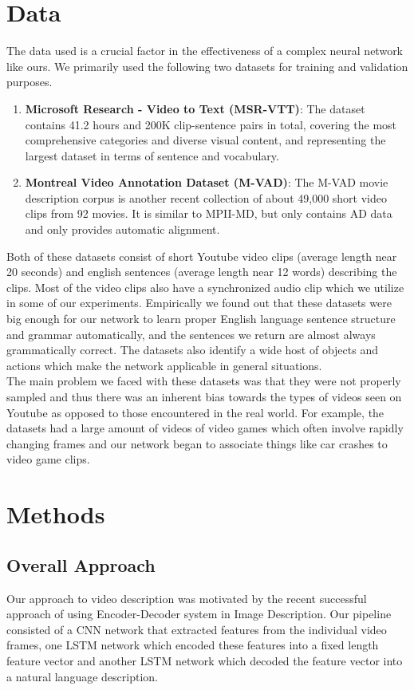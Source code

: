\documentclass[12pt]{article}
\begin{document}
	\section{Data}
The data used is a crucial factor in the effectiveness of a complex neural network like ours. We primarily used the following two datasets for training and validation purposes.
	\begin{enumerate}
		\item
			\textbf{Microsoft Research - Video to Text (MSR-VTT)}: The dataset contains 41.2 hours and 200K clip-sentence pairs in total, covering the most comprehensive categories and diverse visual content, and representing the largest dataset in terms of sentence and vocabulary.
		\item
			\textbf{Montreal Video Annotation Dataset (M-VAD)}: The M-VAD movie description corpus is another recent collection of about 49,000 short video clips from 92 movies. It is similar to MPII-MD, but only contains AD data and only provides automatic alignment.
		\end{enumerate}
		Both of these datasets consist of short Youtube video clips (average length near 20 seconds) and english sentences (average length near 12 words) describing the clips. Most of the video clips also have a synchronized audio clip which we utilize in some of our experiments. 
		Empirically we found out that these datasets were big enough for our network to learn proper English language sentence structure and grammar automatically, and the sentences we return are almost always grammatically correct. The datasets also identify a wide host of objects and actions which make the network applicable in general situations.\\
		The main problem we faced with these datasets was that they were not properly sampled and thus there was an inherent bias towards the types of videos seen on Youtube as opposed to those encountered in the real world. For example, the datasets had a large amount of videos of video games which often involve rapidly changing frames and our network began to associate things like car crashes to video game clips. 
\section{Methods}
\subsection{Overall Approach}
	Our approach to video description was motivated by the recent successful approach of using Encoder-Decoder system in Image Description.
	Our pipeline consisted of a CNN network that extracted features from the individual video frames, one LSTM network which encoded these features into a fixed length feature vector and another LSTM network which decoded the feature vector into a natural language description.
\end{document}

